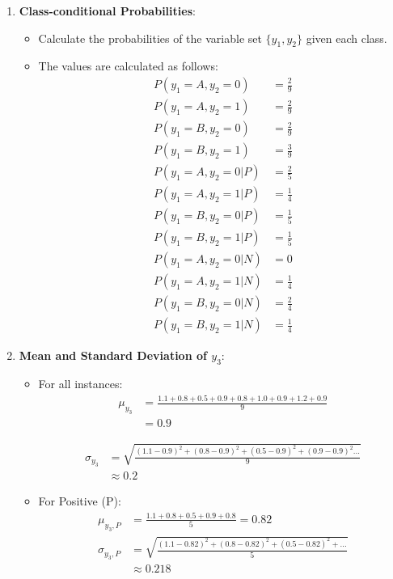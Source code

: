 \documentclass{article}
\begin{document}
\begin{enumerate}[leftmargin=\labelsep]
\begin{enumerate}
    \item \textbf{Class-conditional Probabilities}:
    \begin{itemize}
        \item Calculate the probabilities of the variable set \(\{y_1, y_2\}\) given each class.
        \item The values are calculated as follows:
        \begin{align*}
            P(y_1 = A, y_2 = 0) &= \frac{2}{9} \\
            P(y_1 = A, y_2 = 1) &= \frac{2}{9} \\
            P(y_1 = B, y_2 = 0) &= \frac{2}{9} \\
            P(y_1 = B, y_2 = 1) &= \frac{3}{9} \\
            P(y_1 = A, y_2 = 0 | P) &= \frac{2}{5} \\
            P(y_1 = A, y_2 = 1 | P) &= \frac{1}{4} \\
            P(y_1 = B, y_2 = 0 | P) &= \frac{1}{5} \\
            P(y_1 = B, y_2 = 1 | P) &= \frac{1}{5} \\
            P(y_1 = A, y_2 = 0 | N) &= 0 \\
            P(y_1 = A, y_2 = 1 | N) &= \frac{1}{4} \\
            P(y_1 = B, y_2 = 0 | N) &= \frac{2}{4} \\
            P(y_1 = B, y_2 = 1 | N) &= \frac{1}{4}
        \end{align*}
    \end{itemize}

    \item \textbf{Mean and Standard Deviation of \(y_3\)}:
    \begin{itemize}
        \item For all instances:    
        \begin{align*}
            \mu_{y_3} &= \frac{1.1 + 0.8 + 0.5 + 0.9 + 0.8 + 1.0 + 0.9 + 1.2 + 0.9}{9} \\ 
                      &= 0.9
        \end{align*}
        
        \begin{align*}
            \sigma_{y_3} &= \sqrt{\frac{(1.1 - 0.9)^2 + (0.8 - 0.9)^2 + (0.5 - 0.9)^2 + (0.9 - 0.9)^2...}{9}} \\
                          &\approx 0.2
        \end{align*}
        
        \item For Positive (P):
        \begin{align*}
            \mu_{y_3,P} &= \frac{1.1 + 0.8 + 0.5 + 0.9 + 0.8}{5} = 0.82 \\
            \sigma_{y_3,P} &= \sqrt{\frac{(1.1 - 0.82)^2 + (0.8 - 0.82)^2 + (0.5 - 0.82)^2 + ...}{5}} \\
                          &\approx 0.218
        \end{align*}
    

\end{itemize}
\end{enumerate}
\end{enumerate}
\end{document}
